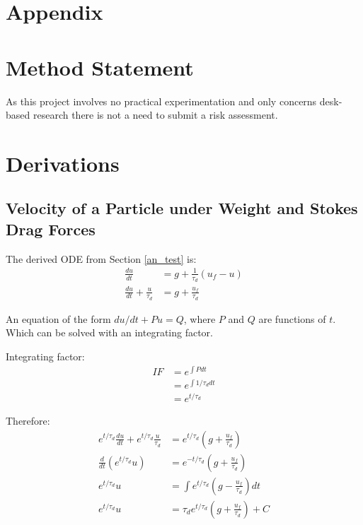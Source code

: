 \documentclass[../Interim_Report_Master]{subfiles}
\begin{document}
\hypertarget{apend}{\section*{Appendix}\label{apend}}
\appendix
\section{Method Statement}
As this project involves no practical experimentation and only concerns desk-based research there is not a need to submit a risk assessment.
\section{Derivations}
\subsection{Velocity of a Particle under Weight and Stokes Drag Forces}\label{particle_grav_drag_dev}
The derived ODE from Section \ref{an_test} is:
\begin{subequations}
	\begin{align}
	\frac{du}{dt} &= g + \frac{1}{\tau_d}(u_f-u) \\
	\frac{du}{dt} + \frac{u}{\tau_d} &= g + \frac{u_f}{\tau_d}
	\end{align}
\end{subequations}

An equation of the form $du/dt + Pu = Q$, where $P$ and $Q$ are functions of $t$. Which can be solved with an integrating factor.

Integrating factor:
\begin{subequations}
	\begin{align}
	IF &= e^{\int P dt} \\
	&= e^{\int 1/\tau_d dt} \\
	&= e^{t/\tau_d}
	\end{align}
\end{subequations}

Therefore:
\begin{subequations}
	\begin{align}
	e^{t/\tau_d}\frac{du}{dt} + e^{t/\tau_d}\frac{u}{\tau_d} &= e^{t/\tau_d}\left(g + \frac{u_f}{\tau_d}\right) \\
	\frac{d}{dt}\left(e^{t/\tau_d}u\right) &= e^{-t/\tau_d}\left(g + \frac{u_f}{\tau_d}\right) \\
	e^{t/\tau_d}u &= \int e^{t/\tau_d}\left(g - \frac{u_f}{\tau_d}\right) dt \\
	e^{t/\tau_d}u &= \tau_de^{t/\tau_d}\left(g + \frac{u_f}{\tau_d}\right) + C 
	\end{align}
\end{subequations}
\end{document}
